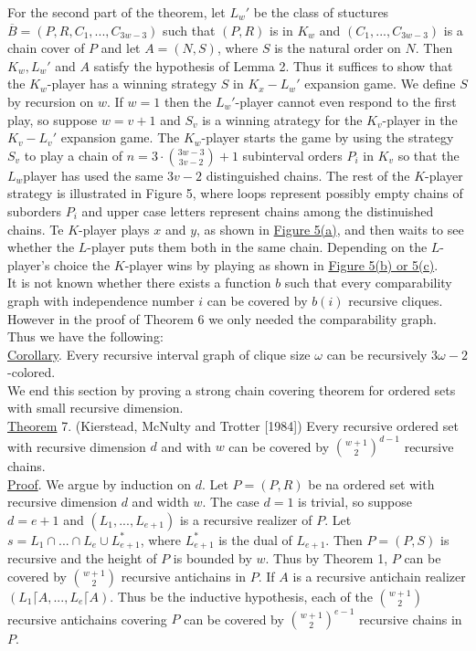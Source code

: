 \documentclass[twoside]{article}
\begin{document}
For the second part of the theorem, let $L_w'$ be the class of stuctures
$\overline{B} = (P,R,C_1,...,C_{3w-3})$ such that $(P,R)$ is in $K_w$ and 
$(C_1,...,C_{3w-3})$ is a chain cover of $P$ and let $A=(N,S)$, where $S$ 
is the natural order on $N$. Then $K_w,L_w'$ and $A$ satisfy the
hypothesis of Lemma 2. Thus it suffices to show that the $K_w$-player has
a winning strategy $S$ in $K_x-L_w'$ expansion game.
%
%
We define $S$ by recursion on $w$. If $w=1$ then the $L_w'$-player cannot
even respond to the first play, so suppose $w=v+1$ and $S_v$ is a winning atrategy
for the $K_v$-player in the $K_v-L_v'$ expansion game. The $K_w$-player starts
the game by using the strategy $S_v$ to play a chain of 
$n = 3 \cdot {{3w-3} \choose {3v-2}} +1$ subinterval orders $P_i$ in $K_v$ so that
the $L_w$player has used the same $3v-2$ distinguished chains. The rest of the $K$-player
strategy is illustrated in  Figure 5, where loops represent possibly empty chains of
suborders $P_i$ and upper case letters represent chains among the distinuished chains.
Te $K$-player plays $x$ and $y$, as shown in \underline{Figure 5(a)}, and then waits
to see whether the $L$-player puts them both in the same chain. Depending on the 
$L$-player's choice the $K$-player wins by playing as shown in
\underline{Figure 5(b) or 5(c)}.\\

It is not known whether there exists a function $b$ such that every comparability
graph with independence number $i$ can be covered by $b(i)$ recursive cliques.
However in the proof of Theorem 6 we only needed the comparability graph.
Thus we have the following:\\
\newline
\underline{Corollary}. Every recursive interval graph of clique size $\omega$ can
be recursively $3\omega -2$-colored.\\
\newline
We end this section by proving a strong chain covering theorem for ordered sets with small 
recursive dimension.\\
\newline
\underline{Theorem} 7. (Kierstead, McNulty and Trotter [1984]) Every recursive
ordered set with recursive dimension $d$ and with $w$ can be covered by 
${{w+1} \choose 2}^{d-1}$ recursive chains.\\
\newline
\underline{Proof}. We argue by induction on $d$. Let $P = (P,R)$ be na ordered set 
with recursive dimension $d$ and width $w$. The case $d=1$ is trivial, so suppose
$d=e+1$ and $(L_1,...,L_{e+1})$ is a recursive realizer of $P$. Let
$s=L_1 \cap ... \cap L_e\cup L_{e+1}^*$, where $L_{e+1}^*$ is the dual of $L_{e+1}$.
Then $P=(P,S)$ is recursive and the height of $P$ is bounded by $w$. Thus by Theorem 1, $P$
can be covered by ${w+1} \choose 2$ recursive antichains in $P$. If $A$ is a recursive antichain
realizer $(L_1 \lceil A,...,L_e \lceil A)$. Thus be the inductive hypothesis, each of the 
${w+1 \choose 2}$ recursive antichains covering $P$ can be covered by ${{w+1} \choose 2}^{e-1}$
recursive chains in $P$.\\
\end{document}
